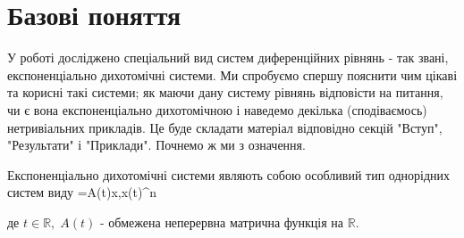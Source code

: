 \documentclass[14pt]{extarticle} %
\begin{document}
\section{Базові поняття}
У роботі досліджено спеціальний вид систем диференційних рівнянь - так звані, експоненціально дихотомічні системи.
Ми спробуємо спершу пояснити чим цікаві та корисні такі системи; як маючи дану систему рівнянь відповісти на питання, чи
є вона експоненціально дихотомічною і наведемо декілька (сподіваємось) нетривіальних прикладів. Це буде складати матеріал
відповідно секцій "Вступ"{}, "Результати" і "Приклади". 
Почнемо ж ми з означення.

Експоненціально дихотомічні системи являють собою особливий тип однорідних систем виду
\equation\label{LinHomSysDef}=A(t)x,\;x(t)\in{}^n\endequation

де $t\in\mathbb{R},\; A(t)$ - обмежена неперервна матрична функція на $\mathbb{R}$. 
\end{document}
